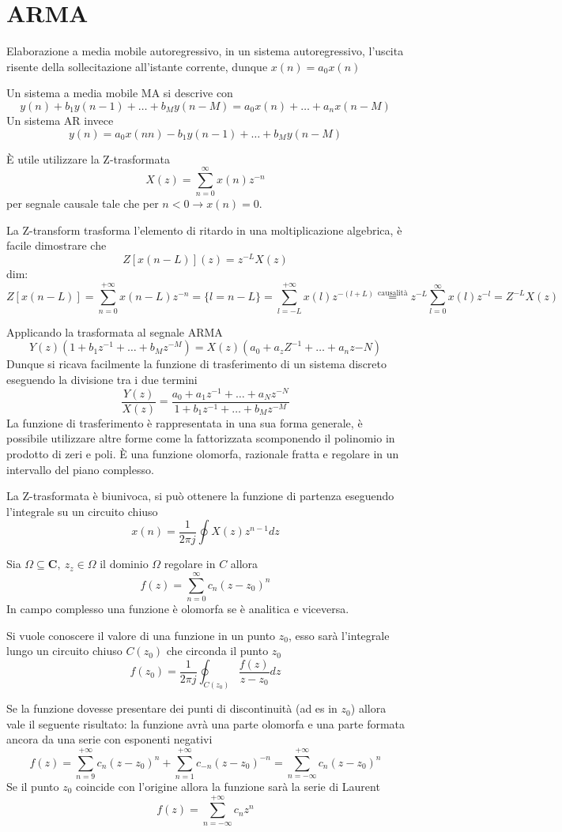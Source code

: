 
\section{ARMA}
Elaborazione a media mobile autoregressivo, in un sistema autoregressivo,
l'uscita risente della sollecitazione all'istante corrente, dunque $x(n)=a_0
x(n)$

Un sistema a media mobile MA si descrive con
$$
y(n) + b_1y(n-1) + \dots + b_My(n-M) = a_0 x(n) + \dots + a_n x(n-M)
$$
Un sistema AR invece
$$
y(n) = a_0 x(nn) - b_1y(n-1) + \dots + b_My(n-M)
$$


È utile utilizzare la Z-trasformata
$$
X(z) = \sum_{n=0}^{\infty} x(n)z^{-n}
$$
per segnale causale tale che per $n<0 \rightarrow x(n)=0$.

La Z-transform trasforma l'elemento di ritardo in una moltiplicazione algebrica,
è facile dimostrare che
$$
Z[x(n-L)](z) = z^{-L}X(z)
$$
dim:
$$
Z[x(n-L)] = \sum_{n=0}^{+\infty} x(n-L)z^{-n} = \{l=n-L\} =
\sum_{l=-L}^{+\infty} x(l) z^{-(l+L)} \stackrel{\text{causalità}}{=}
z^{-L}\sum_{l=0}^{\infty}x(l)z^{-l} = Z^{-L}X(z)
$$

Applicando la trasformata al segnale ARMA
$$
Y(z)(1+b_1z^{-1} + \dots + b_Mz^{-M}) = X(z)(a_0+a_zZ^{-1} + \dots + a_nz{-N})
$$
Dunque si ricava facilmente la funzione di trasferimento di un sistema discreto
eseguendo la divisione tra i due termini
$$
\frac{Y(z)}{X(z)} = \frac{a_0 + a_1z^{-1} + \dots + a_Nz^{-N}}{1 + b_1z^{-1} +
\dots + b_Mz^{-M}}
$$
La funzione di trasferimento è rappresentata in una sua forma generale, è
possibile utilizzare altre forme come la fattorizzata scomponendo il polinomio
in prodotto di zeri e poli.
È una funzione olomorfa, razionale fratta e regolare in un intervallo del piano
complesso.

La Z-trasformata è biunivoca, si può ottenere la funzione di partenza eseguendo
l'integrale su un circuito chiuso
$$
x(n) = \frac{1}{2\pi j} \oint X(z)z^{n-1}dz
$$

Sia $\Omega \subseteq \mathbf{C},\ z_z \in \Omega$ il dominio $\Omega$
regolare in $C$ allora
$$
f(z) = \sum_{n=0}^{\infty} c_n(z-z_0)^n
$$
In campo complesso una funzione è olomorfa se è analitica e viceversa.

Si vuole conoscere il valore di una funzione in un punto $z_0$, esso sarà
l'integrale lungo un circuito chiuso $C(z_0)$ che circonda il punto $z_0$
$$
f(z_0) = \frac{1}{2\pi j} \oint_{C(z_0)} \frac{f(z)}{z-z_0} dz
$$


Se la funzione dovesse presentare dei punti di discontinuità (ad es in $z_0$)
allora vale il seguente risultato: la funzione avrà una parte olomorfa e una
parte formata ancora da una serie con esponenti negativi
$$
f(z) = \sum_{n=9}^{+\infty} c_n(z-z_0)^n + \sum_{n=1}^{+\infty}
c_{-n}(z-z_0)^{-n} = \sum_{n=-\infty}^{+\infty} c_n(z-z_0)^n
$$
Se il punto $z_0$ coincide con l'origine allora la funzione sarà
la serie di Laurent
$$
f(z) = \sum_{n=-\infty}^{+\infty} c_nz^n
$$

